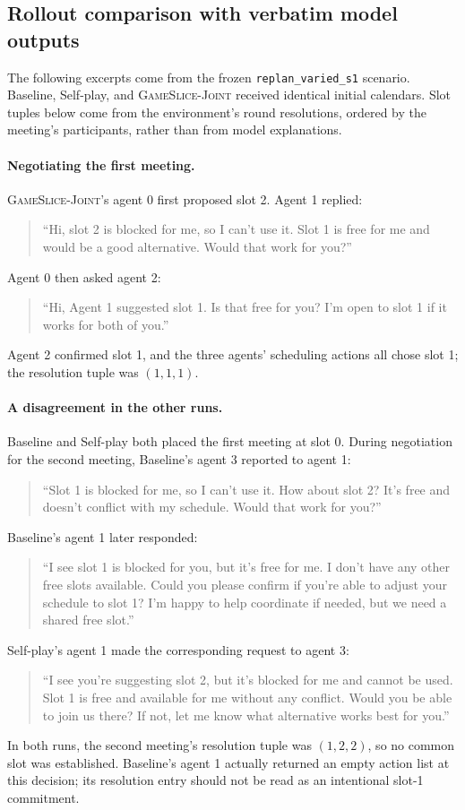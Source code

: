 \subsection{Rollout comparison with verbatim model outputs}
\label{app:calbench-rollout}

The following excerpts come from the frozen \texttt{replan\_varied\_s1}
scenario. Baseline, Self-play, and \textsc{GameSlice-Joint} received
identical initial calendars. Slot tuples below come from the environment's round resolutions,
ordered by the meeting's participants, rather than from model explanations.

\paragraph{Negotiating the first meeting.}
\textsc{GameSlice-Joint}'s agent 0 first proposed slot 2. Agent 1 replied:
\begin{quote}\small
``Hi, slot 2 is blocked for me, so I can't use it. Slot 1 is free for me and
would be a good alternative. Would that work for you?''
\end{quote}
Agent 0 then asked agent 2:
\begin{quote}\small
``Hi, Agent 1 suggested slot 1. Is that free for you? I'm open to slot 1 if it
works for both of you.''
\end{quote}
Agent 2 confirmed slot 1, and the three agents' scheduling actions all chose
slot 1; the resolution tuple was $(1,1,1)$.

\paragraph{A disagreement in the other runs.}
Baseline and Self-play both placed the first meeting at slot 0. During negotiation for
the second meeting, Baseline's agent 3 reported to agent 1:
\begin{quote}\small
``Slot 1 is blocked for me, so I can't use it. How about slot 2? It's free and
doesn't conflict with my schedule. Would that work for you?''
\end{quote}
Baseline's agent 1 later responded:
\begin{quote}\small
``I see slot 1 is blocked for you, but it's free for me. I don't have any other
free slots available. Could you please confirm if you're able to adjust your
schedule to slot 1? I'm happy to help coordinate if needed, but we need a
shared free slot.''
\end{quote}
Self-play's agent 1 made the corresponding request to agent 3:
\begin{quote}\small
``I see you're suggesting slot 2, but it's blocked for me and cannot be used.
Slot 1 is free and available for me without any conflict. Would you be able to
join us there? If not, let me know what alternative works best for you.''
\end{quote}
In both runs, the second
meeting's resolution tuple was $(1,2,2)$, so no common slot was established.
Baseline's agent 1 actually returned an empty action list at this decision; its
resolution entry should not be read as an intentional slot-1 commitment.

